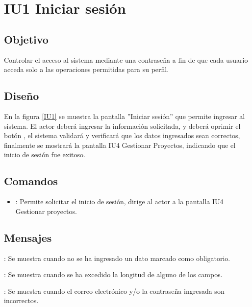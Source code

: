 \section{IU1 Iniciar sesión}

\subsection{Objetivo}
	Controlar el acceso al sistema mediante una contraseña a fin de que cada usuario acceda solo a las operaciones permitidas para su perfil.

\subsection{Diseño}
	En la figura \ref{IU1} se muestra la pantalla ''Iniciar sesión'' que permite ingresar al sistema. El actor deberá ingresar la información solicitada, y deberá oprimir el botón , el sistema validará y verificará que los datos ingresados sean correctos, finalmente se mostrará la pantalla IU4 Gestionar Proyectos, indicando que el inicio de sesión fue exitoso.

\label{IU1}
\subsection{Comandos}
\begin{itemize}
	\item {}: Permite solicitar el inicio de sesión, dirige al actor a la pantalla IU4 Gestionar proyectos.
\end{itemize}

\subsection{Mensajes}

\begin{Citemize}
	\item {}: Se muestra cuando no se ha ingresado un dato marcado como obligatorio.
	\item {}: Se muestra cuando se ha excedido la longitud de alguno de los campos.
	\item {}: Se muestra cuando el correo electrónico y/o la contraseña ingresada son incorrectos.
\end{Citemize}

